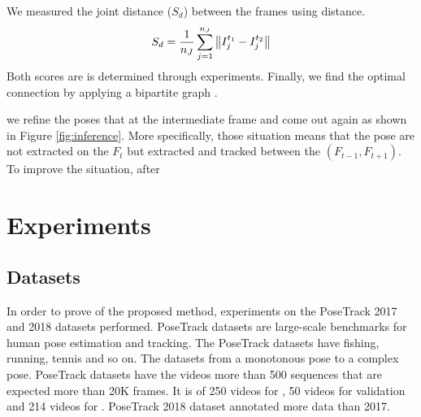 \documentclass[conference]{IEEEtran}
\begin{document}
We measured the joint distance (\(S_{d}\)) between the frames using  distance. 
\begin{equation}
    S_{\textcolor{black}{d}} = \frac{1}{n_J}\sum_{j=1}^{n_J}\begin{Vmatrix}
I_{j}^{t_1} - I_{j}^{t_2} \end{Vmatrix}
\end{equation}
Both scores are  is determined through experiments. Finally, we find the optimal connection by applying a bipartite graph \cite{doering2018joint}. 



 we refine the poses that  at the intermediate frame and come out again as shown in  Figure \ref{fig:inference}. More specifically, those situation means that the pose are not extracted on the  $F_{t}$ but extracted and tracked between the  $(F_{t-1}, F_{t+1})$.
To improve the situation, after 


\section{Experiments}

\subsection{Datasets}

In order to prove  of the proposed method, experiments on the PoseTrack 2017 and 2018 datasets \cite{PoseTrack}  performed. PoseTrack datasets are large-scale benchmarks for human pose estimation and tracking. The PoseTrack datasets have  fishing, running, tennis and so on. The datasets  from a monotonous pose to a complex pose.
PoseTrack datasets have the videos more than 500 sequences that are expected  more than 20K frames. It is  of 250 videos for , 50 videos for validation and 214 videos for . PoseTrack 2018 dataset annotated more data than 2017. 
\end{document}
